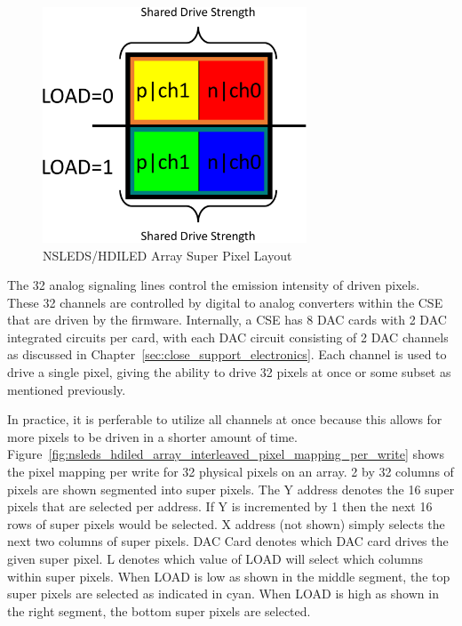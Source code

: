     \begin{figure}
        \centering
        \includegraphics[width=0.70\textwidth]{fig/superpixel_layout.pdf}
        \caption{NSLEDS/HDILED Array Super Pixel Layout}
        \label{fig:nsleds_hdiled_array_superpixel_layout}
    \end{figure}

    The 32 analog signaling lines control the emission intensity of driven pixels. These 32 channels are controlled by digital to analog converters within the CSE that are driven by the firmware. Internally, a CSE has 8 DAC cards with 2 DAC integrated circuits per card, with each DAC circuit consisting of 2 DAC channels as discussed in Chapter~\ref{sec:close_support_electronics}. Each channel is used to drive a single pixel, giving the ability to drive 32 pixels at once or some subset as mentioned previously.

    In practice, it is perferable to utilize all channels at once because this allows for more pixels to be driven in a shorter amount of time. Figure~\ref{fig:nsleds_hdiled_array_interleaved_pixel_mapping_per_write} shows the pixel mapping per write for 32 physical pixels on an array. 2 by 32 columns of pixels are shown segmented into super pixels. The Y address denotes the 16 super pixels that are selected per address. If Y is incremented by 1 then the next 16 rows of super pixels would be selected. X address (not shown) simply selects the next two columns of super pixels. DAC Card denotes which DAC card drives the given super pixel. L denotes which value of LOAD will select which columns within super pixels. When LOAD is low as shown in the middle segment, the top super pixels are selected as indicated in cyan. When LOAD is high as shown in the right segment, the bottom super pixels are selected.

